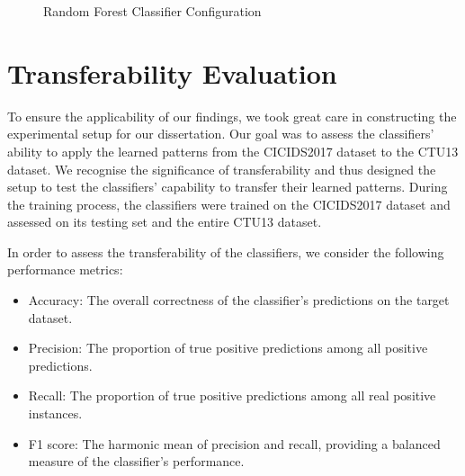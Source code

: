 \begin{figure}[H]
\centering
{}
\caption{Random Forest Classifier Configuration}\label{fig:RandomForest+SVMClassifierClassifierConfig}
\end{figure}

\section{Transferability Evaluation}\label{sec:TransferabilityEvaluation}

To ensure the applicability of our findings, we took great care in constructing the experimental setup for our dissertation. Our goal was to assess the classifiers' ability to apply the learned patterns from the CICIDS2017 dataset to the CTU13 dataset. We recognise the significance of transferability and thus designed the setup to test the classifiers' capability to transfer their learned patterns. During the training process, the classifiers were trained on the CICIDS2017 dataset and assessed on its testing set and the entire CTU13 dataset.

In order to assess the transferability of the classifiers, we consider the following performance metrics:

\begin{itemize}
\item Accuracy: The overall correctness of the classifier's predictions on the target dataset.
\item Precision: The proportion of true positive predictions among all positive predictions.
\item Recall: The proportion of true positive predictions among all real positive instances.
\item F1 score: The harmonic mean of precision and recall, providing a balanced measure of the classifier's performance.
\end{itemize}

